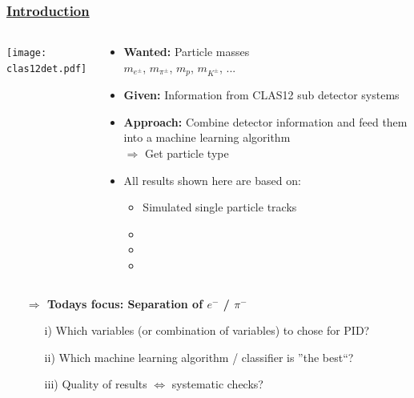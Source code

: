 \documentclass[xcolor=table, xcolor=dvipsnames]{beamer}
\begin{document}
 \begin{frame}
   \frametitle{\hyperlink{con}{Introduction}}
   \label{intro}
   \footnotesize
   
   \begin{columns}
     \begin{column}{6cm}
       \texttt{[image: clas12det.pdf]}
     \end{column}
    
     \begin{column}{6cm}
       \begin{itemize}
         \item {\bf Wanted:} Particle masses \\ $m_{e^{\pm}}$, $m_{\pi^{\pm}}$, $m_{p}$, $m_{K^{\pm}}$, ...
         \item {\bf Given:} Information from CLAS12 sub detector systems
         \item {\bf Approach:}  Combine detector information and feed them into a machine learning algorithm \\ $\Rightarrow$ Get particle type
         \item  All results shown here are based on:
         \begin{itemize}
           \footnotesize
           \item Simulated single particle tracks
           \item {}
           \item {}
           \item {} 
         \end{itemize}
       \end{itemize}
      \end{column}
    \end{columns}
    
    \begin{itemize}
      \item[] {\bf $\Rightarrow$ Todays focus:  Separation of $e^{-}$ / $\pi^{-}$}
      \begin{itemize}
        \scriptsize
        \item[i)] Which variables (or combination of variables) to chose for PID?
        \item[ii)]  Which machine learning algorithm / classifier is ''the best``?
        \item[iii)] Quality of results $\Leftrightarrow$ systematic checks?
      \end{itemize}
    \end{itemize}
 \end{frame}
 
\end{document}
